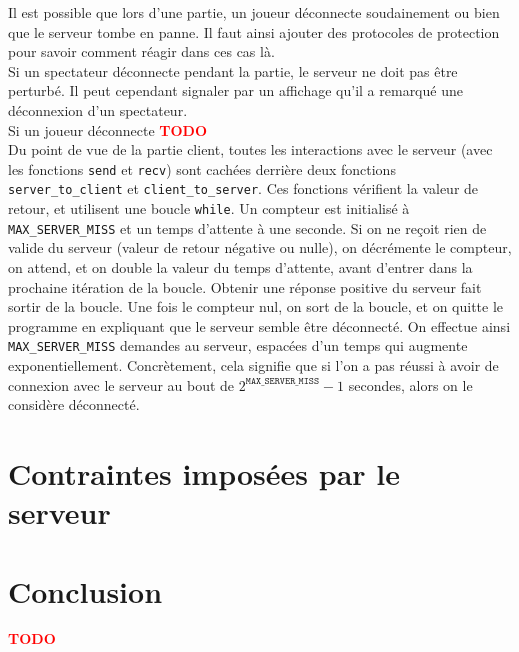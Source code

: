 \documentclass[a4paper]{article}
\newcommand{\TODO}{\textcolor{red}{\textbf{TODO}}}
\begin{document}
Il est possible que lors d'une partie, un joueur déconnecte soudainement ou bien que le serveur tombe en panne. Il faut ainsi ajouter des protocoles de protection pour savoir comment réagir dans ces cas là. \\

Si un spectateur déconnecte pendant la partie, le serveur ne doit pas être perturbé. Il peut cependant signaler par un affichage qu'il a remarqué une déconnexion d'un spectateur. \\

Si un joueur déconnecte \TODO \\

Du point de vue de la partie client, toutes les interactions avec le serveur (avec les fonctions \texttt{send} et \texttt{recv}) sont cachées derrière deux fonctions \texttt{server\_to\_client} et \texttt{client\_to\_server}. Ces fonctions vérifient la valeur de retour, et utilisent une boucle \texttt{while}. Un compteur est initialisé à \texttt{MAX\_SERVER\_MISS} et un temps d'attente à une seconde. Si on ne reçoit rien de valide du serveur (valeur de retour négative ou nulle), on décrémente le compteur, on attend, et on double la valeur du temps d'attente, avant d'entrer dans la prochaine itération de la boucle. Obtenir une réponse positive du serveur fait sortir de la boucle. Une fois le compteur nul, on sort de la boucle, et on quitte le programme en expliquant que le serveur semble être déconnecté. On effectue ainsi \texttt{MAX\_SERVER\_MISS} demandes au serveur, espacées d'un temps qui augmente exponentiellement. Concrètement, cela signifie que si l'on a pas réussi à avoir de connexion avec le serveur au bout de $2^{\texttt{MAX\_SERVER\_MISS}} - 1$ secondes, alors on le considère déconnecté. \\


\section{Contraintes imposées par le serveur}


\section*{Conclusion}

\TODO


 

\end{document}
